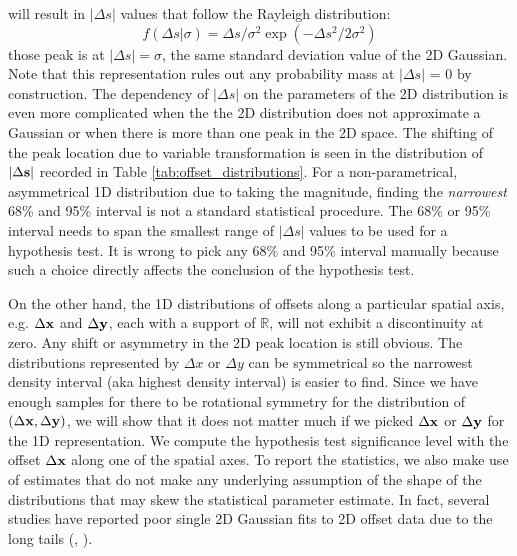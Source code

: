 will result in $|\Delta s|$ values that follow the Rayleigh distribution:
\begin{equation}
	f(\Delta s | \sigma) = \Delta s /  \sigma^2 \exp(-\Delta s^2 / 2 \sigma^2)
\end{equation}
those peak is at $|\Delta s| = \sigma$, the same standard deviation value of the 2D
Gaussian. Note that this representation  
rules out any probability mass at $|\Delta s|$ = 0 by construction. 
The dependency of $|\Delta s|$ on the parameters of
the 2D distribution is even more
complicated when the the 2D distribution does not approximate a Gaussian 
or when there is more than one peak in the 2D space. 
The shifting of the peak location due to variable transformation 
is seen in the distribution of $|\Delta {\bf s}|$ recorded in Table
\ref{tab:offset_distributions}.
For a non-parametrical, asymmetrical 1D distribution due to taking the magnitude, 
finding the {\it narrowest} 68\% and 95\% interval
is not a standard statistical procedure. The 68\% or 95\% interval needs to
span the smallest range of $|\Delta s|$ values to be used for a hypothesis test.
It is wrong to pick any 68\% and 95\% interval manually because such a choice
directly affects the conclusion of the hypothesis test.

On the other hand, 
the 1D distributions of offsets along a particular spatial axis, 
e.g. $\Delta {\bf x}$ and $\Delta {\bf y}$,
each with a support of $\mathbb{R}$, will not exhibit a discontinuity at zero.
Any shift or asymmetry in the 2D peak location is still obvious. 
The distributions represented by $\Delta x$ or $\Delta y$ 
can be symmetrical so 
the narrowest density interval (aka highest density interval) is easier to find.
Since we have enough samples for there to be
rotational symmetry for the distribution of $(\Delta {\bf x}, \Delta {\bf y})$,
we will show that it does not
matter much if we picked $\Delta {\bf x}$ or $\Delta {\bf y}$ for the 1D representation.
We compute the hypothesis test significance level with the 
 offset $\Delta {\bf x}$ along one of the spatial axes. 
To report the statistics, we also make use of estimates that do not make any
underlying assumption of the shape of the distributions that may skew the
statistical parameter estimate.
In fact, several studies have reported poor single 2D Gaussian fits to 2D offset data
due to the long tails
(\citealt{Zitrin2012a}, \citealt{Oguri2010}).  

